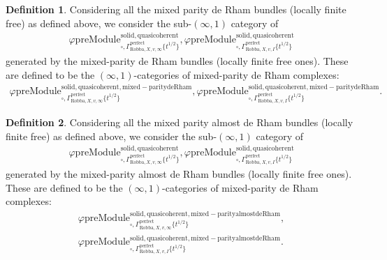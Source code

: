\documentclass[12pt]{book}
\theoremstyle{definition}
\newtheorem{definition}{Definition}
\begin{document}
\begin{definition}
Considering all the mixed parity de Rham bundles (locally finite free) as defined above, we consider the sub-$(\infty,1)$ category of 
\begin{align}
\varphi\mathrm{preModule}^\mathrm{solid,quasicoherent}_{\square,\Gamma^\mathrm{perfect}_{\text{Robba},X,v,\infty}\{t^{1/2}\}},
\varphi\mathrm{preModule}^\mathrm{solid,quasicoherent}_{\square,\Gamma^\mathrm{perfect}_{\text{Robba},X,v,I}\{t^{1/2}\}} 
\end{align}
generated by the mixed-parity de Rham bundles (locally finite free ones). These are defined to be the $(\infty,1)$-categories of mixed-parity de Rham complexes:
\begin{align}
\varphi\mathrm{preModule}^\mathrm{solid,quasicoherent,mixed-paritydeRham}_{\square,\Gamma^\mathrm{perfect}_{\text{Robba},X,v,\infty}\{t^{1/2}\}},
\varphi\mathrm{preModule}^\mathrm{solid,quasicoherent,mixed-paritydeRham}_{\square,\Gamma^\mathrm{perfect}_{\text{Robba},X,v,I}\{t^{1/2}\}}. 
\end{align}
\end{definition}


\begin{definition}
Considering all the mixed parity almost de Rham bundles (locally finite free) as defined above, we consider the sub-$(\infty,1)$ category of 
\begin{align}
\varphi\mathrm{preModule}^\mathrm{solid,quasicoherent}_{\square,\Gamma^\mathrm{perfect}_{\text{Robba},X,v,\infty}\{t^{1/2}\}},
\varphi\mathrm{preModule}^\mathrm{solid,quasicoherent}_{\square,\Gamma^\mathrm{perfect}_{\text{Robba},X,v,I}\{t^{1/2}\}} 
\end{align}
generated by the mixed-parity almost de Rham bundles (locally finite free ones). These are defined to be the $(\infty,1)$-categories of mixed-parity de Rham complexes:
\begin{align}
\varphi\mathrm{preModule}^\mathrm{solid,quasicoherent,mixed-parityalmostdeRham}_{\square,\Gamma^\mathrm{perfect}_{\text{Robba},X,v,\infty}\{t^{1/2}\}},\\
\varphi\mathrm{preModule}^\mathrm{solid,quasicoherent,mixed-parityalmostdeRham}_{\square,\Gamma^\mathrm{perfect}_{\text{Robba},X,v,I}\{t^{1/2}\}}. 
\end{align}
\end{definition}
\end{document}
